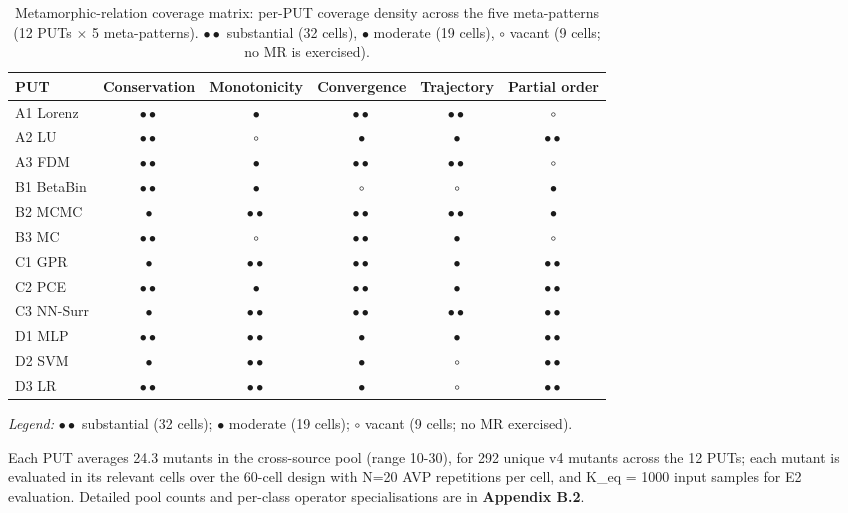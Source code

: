 \documentclass[manuscript,screen,review]{acmart}
\begin{document}
{%
\small
\begin{longtable}[]{@{}lccccc@{}}
\caption{Metamorphic-relation coverage matrix: per-PUT coverage density across the five meta-patterns (12 PUTs $\times$ 5 meta-patterns). $\bullet\bullet$ substantial (32 cells), $\bullet$ moderate (19 cells), $\circ$ vacant (9 cells; no MR is exercised).}\label{tab:p2-cells}\\
\toprule\noalign{}
PUT & Conservation & Monotonicity & Convergence & Trajectory & Partial order \\
\midrule\noalign{}
\endfirsthead
\endhead
\bottomrule\noalign{}
\endlastfoot
A1 Lorenz  & $\bullet\bullet$ & $\bullet$ & $\bullet\bullet$ & $\bullet\bullet$ & $\circ$ \\
A2 LU      & $\bullet\bullet$ & $\circ$ & $\bullet$ & $\bullet$ & $\bullet\bullet$ \\
A3 FDM     & $\bullet\bullet$ & $\bullet$ & $\bullet\bullet$ & $\bullet\bullet$ & $\circ$ \\
B1 BetaBin & $\bullet\bullet$ & $\bullet$ & $\circ$ & $\circ$ & $\bullet$ \\
B2 MCMC    & $\bullet$ & $\bullet\bullet$ & $\bullet\bullet$ & $\bullet\bullet$ & $\bullet$ \\
B3 MC      & $\bullet\bullet$ & $\circ$ & $\bullet\bullet$ & $\bullet$ & $\circ$ \\
C1 GPR     & $\bullet$ & $\bullet\bullet$ & $\bullet\bullet$ & $\bullet$ & $\bullet\bullet$ \\
C2 PCE     & $\bullet\bullet$ & $\bullet$ & $\bullet\bullet$ & $\bullet$ & $\bullet\bullet$ \\
C3 NN-Surr & $\bullet$ & $\bullet\bullet$ & $\bullet\bullet$ & $\bullet\bullet$ & $\bullet\bullet$ \\
D1 MLP     & $\bullet\bullet$ & $\bullet\bullet$ & $\bullet$ & $\bullet$ & $\bullet\bullet$ \\
D2 SVM     & $\bullet$ & $\bullet\bullet$ & $\bullet$ & $\circ$ & $\bullet\bullet$ \\
D3 LR      & $\bullet\bullet$ & $\bullet\bullet$ & $\bullet$ & $\circ$ & $\bullet\bullet$ \\
\end{longtable}
}

\noindent\emph{Legend:} $\bullet\bullet$ substantial (32 cells); $\bullet$ moderate (19 cells); $\circ$ vacant (9 cells; no MR exercised).

Each PUT averages 24.3 mutants in the cross-source pool (range
10-30), for 292 unique v4 mutants across the 12 PUTs; each mutant is
evaluated in its relevant cells over the 60-cell design with N=20 AVP
repetitions per cell, and K\_eq = 1000 input samples for E2 evaluation. Detailed
pool counts and per-class operator specialisations are in
\textbf{Appendix B.2}.
\end{document}
